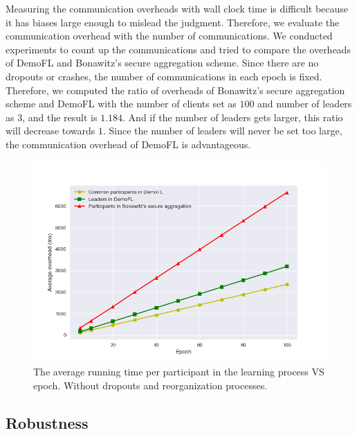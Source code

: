 Measuring the communication overheads with wall clock time is difficult because it has biases large enough to mislead the judgment. Therefore, we evaluate the communication overhead with the number of communications. We conducted experiments to count up the communications and tried to compare the overheads of DemoFL and Bonawitz's secure aggregation scheme. Since there are no dropouts or crashes, the number of communications in each epoch is fixed. Therefore, we computed the ratio of overheads of Bonawitz's secure aggregation scheme and DemoFL with the number of clients set as $100$ and number of leaders as $3$, and the result is $1.184$. And if the number of leaders gets larger, this ratio will decrease towards $1$. Since the number of leaders will never be set too large, the communication overhead of DemoFL is advantageous.

\begin{figure}[!ht]
    \centering
    \includegraphics[width=\columnwidth]{img/learning-overhead.png}
    \caption{The average running time per participant in the learning process VS epoch. Without dropouts and reorganization processes.}
    \label{learning-overhead}
\end{figure}

\subsection{Robustness}
